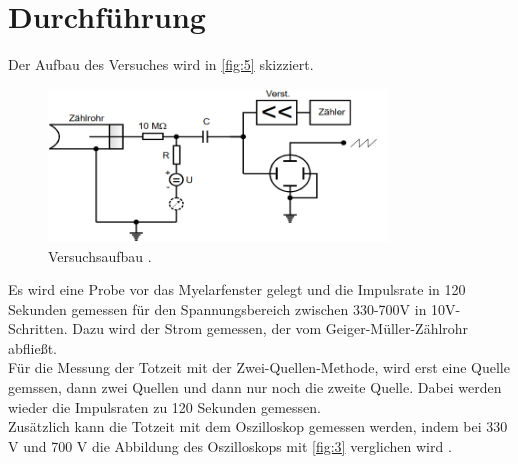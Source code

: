 
\section{Durchführung}
Der Aufbau des Versuches wird in \autoref{fig:5} skizziert.
\begin{figure}[H] 
  \centering 
  \includegraphics[width=9cm]{content/5.png} 
  \caption{Versuchsaufbau \cite{sample}.} 
  \label{fig:5} 
\end{figure}
Es wird eine Probe vor das Myelarfenster gelegt und die Impulsrate in 120 Sekunden gemessen für den Spannungsbereich zwischen 330-700V in 10V-Schritten. Dazu wird der Strom gemessen, der vom Geiger-Müller-Zählrohr abfließt.\\
Für die Messung der Totzeit mit der Zwei-Quellen-Methode, wird erst eine Quelle gemssen, dann zwei Quellen und dann nur noch die zweite Quelle. Dabei werden wieder die Impulsraten zu 120 Sekunden gemessen.\\
Zusätzlich kann die Totzeit mit dem Oszilloskop gemessen werden, indem bei 330 V und 700 V die Abbildung des Oszilloskops mit \autoref{fig:3} verglichen wird \cite{sample}. 
